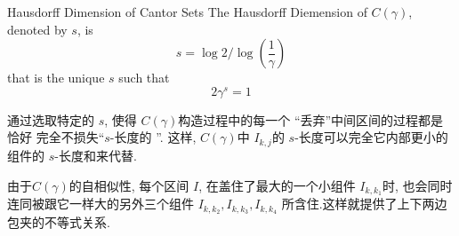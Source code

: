 \documentclass[../main.tex]{subfiles}
\begin{document}
\begin{theorem}{Hausdorff Dimension of Cantor Sets}{}
    The Hausdorff Diemension of \(  C\left(  \gamma  \right)   \), denoted by  \(  s\), is \[
   s= \log 2/ \log\left( \frac{1 }{ \gamma  }  \right) 
    \] that is the unique \(  s  \) such that   \[
    2 \gamma ^{s}= 1
    \] 
\end{theorem}

\begin{note}
    通过选取特定的 \(  s  \), 使得 \(  C\left(  \gamma  \right)   \)构造过程中的每一个 ``丢弃''中间区间的过程都是恰好 完全不损失``\(  s  \)-长度的 ''.  这样, \(  C\left(  \gamma  \right)   \)中 \(  I_{k,j}  \)的 \(  s  \)-长度可以完全它内部更小的组件的 \(  s  \)-长度和来代替.    

    由于\(  C\left(  \gamma  \right)   \)的自相似性, 每个区间 \(  I  \), 在盖住了最大的一个小组件 \(  I_{k,k_{1}}  \)时,  也会同时连同被跟它一样大的另外三个组件 \(  I_{k,k_2},I_{k,k_3},I_{k,k_4}  \)  所含住.这样就提供了上下两边包夹的不等式关系.
\end{note}
\end{document}
